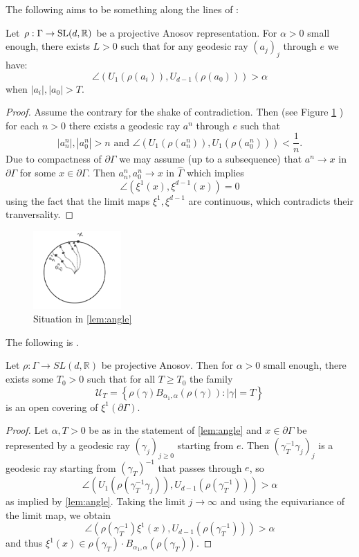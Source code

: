 \documentclass{report}
\begin{document}
The following aims to be something along the lines of \cite*[Lemma 2.4]{pozzetti_anosov_2023}:
\begin{lemma}\label{lem:angle}
    Let $\rho: \Gamma \to \operatorname{{\mathrm{SL}}}(d, \mathbb R)$ be a projective Anosov representation.
    For $\alpha > 0$ small enough, there exists $L>0$ such that for any geodesic ray $(a_j)_j$ through $e$ we have:
    \[
        \angle(U_1(\rho(a_i)), U_{d-1}(\rho(a_0))) > \alpha
    \]
    when $|a_i|, |a_0| > T$.
\end{lemma}
\begin{proof}
Assume the contrary for the shake of contradiction.
Then (see Figure \ref{fig:angle} ) for each $n>0$ there exists a geodesic ray  $a^n$ through $e$ such that 
\[
    |a_n^n|, |a_0^n| > n \text{ and }
    \angle(U_1(\rho(a_n^n)), U_1(\rho(a_0^n))) < \frac{1}{n}.
\]
Due to compactness of $\partial \Gamma$ we may assume (up to a subsequence) that
$a^n \to x$ in $\partial \Gamma$ for some $x \in \partial \Gamma$.
Then 
$a^n_n, a_0^n \to x$ in $\hat \Gamma$ which implies
\[
    \angle (\xi^1(x), \xi^{d-1}(x)) = 0
\]
using the fact that the limit maps $\xi^1, \xi^{d-1}$ are continuous, which contradicts their tranversality.
\end{proof}
\begin{figure}[h]
    \centering
    \includegraphics[width=0.3\textwidth]{angle.jpg}
    \caption{Situation in \cref{lem:angle}}
    \label{fig:angle}
\end{figure}    

The following is \cite[Proposition 3.5]{pozzetti_anosov_2023}.
\begin{lemma}\label{lem:boundary_covering}
Let $\rho: \Gamma \to SL(d, \mathbb R)$ be projective Anosov.
Then for $\alpha > 0$ small enough, there exists some $T_0 > 0$ such that for all $T \geq T_0$ the family
\[
    \mathcal U_T = \left\{ \rho(\gamma) B_{\alpha_1, \alpha}(\rho(\gamma)) : |\gamma| = T \right\}
\]
is an open covering of $\xi^1(\partial \Gamma)$.
\end{lemma}
\begin{proof}
    Let $\alpha, T > 0$ be as in the statement of \cref{lem:angle} and $x \in \partial \Gamma$ be represented by a geodesic ray $(\gamma_j)_{j\geq 0}$ starting from $e$.
    Then $(\gamma_T^{-1} \gamma_j)_j$ is a geodesic ray starting from $(\gamma_T)^{-1}$ that passes through $e$, so
    \[
        \angle (U_1(\rho(\gamma_T^{-1}\gamma_j)), U_{d-1}(\rho(\gamma_T^{-1}))) > \alpha
    \]
    as implied by \cref{lem:angle}.
    Taking the limit $j \to \infty$ and using the equivariance of the limit map, we obtain
    \[
        \angle (\rho(\gamma_T^{-1})\xi^1(x), U_{d-1}(\rho(\gamma_T^{-1}))) > \alpha
    \]
    and thus $\xi^1(x) \in \rho(\gamma_T) \cdot B_{\alpha_1, \alpha}(\rho(\gamma_T))$.
\end{proof}
\end{document}
